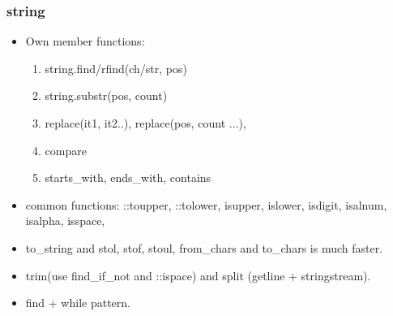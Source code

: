 \documentclass[a4paper,11pt,twoside]{book}
\begin{document}
\subsubsection{string}
\begin{itemize}
	\item Own member functions:
	\begin{enumerate}
		\item string.find/rfind(ch/str, pos)
		
		\item string.substr(pos, count)
		
		\item replace(it1, it2..), replace(pos, count ...),
		
		\item compare
		
		\item starts\_with, ends\_with, contains
		
	\end{enumerate}
	
	\item common functions: ::toupper, ::tolower, isupper, islower, isdigit, isalnum, isalpha, isspace, 
	
	\item to\_string and stol, stof, stoul, from\_chars and to\_chars is much faster.
	
	\item trim(use find\_if\_not and ::ispace) and split (getline + stringstream). 
	
	\item find + while pattern.	
\end{itemize}
\end{document}
